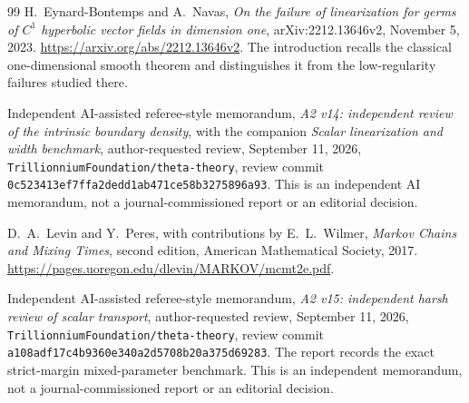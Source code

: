 \begin{thebibliography}{99}
H.~Eynard-Bontemps and A.~Navas, \emph{On the failure of linearization
for germs of $C^1$ hyperbolic vector fields in dimension one},
arXiv:2212.13646v2, November 5, 2023.
\url{https://arxiv.org/abs/2212.13646v2}.
The introduction recalls the classical one-dimensional smooth theorem
and distinguishes it from the low-regularity failures studied there.

Independent AI-assisted referee-style memorandum,
\emph{A2 v14: independent review of the intrinsic boundary density},
with the companion \emph{Scalar linearization and width benchmark},
author-requested review, September 11, 2026,
\texttt{TrillionniumFoundation/theta-theory},
review commit \texttt{0c523413ef7ffa2dedd1ab471ce58b3275896a93}.
This is an independent AI memorandum, not a journal-commissioned report
or an editorial decision.

D.~A.~Levin and Y.~Peres, with contributions by E.~L.~Wilmer,
\emph{Markov Chains and Mixing Times}, second edition,
American Mathematical Society, 2017.
\url{https://pages.uoregon.edu/dlevin/MARKOV/mcmt2e.pdf}.

Independent AI-assisted referee-style memorandum,
\emph{A2 v15: independent harsh review of scalar transport},
author-requested review, September 11, 2026,
\texttt{TrillionniumFoundation/theta-theory},
review commit \texttt{a108adf17c4b9360e340a2d5708b20a375d69283}.
The report records the exact strict-margin mixed-parameter benchmark.
This is an independent memorandum, not a journal-commissioned report
or an editorial decision.

\end{thebibliography}
